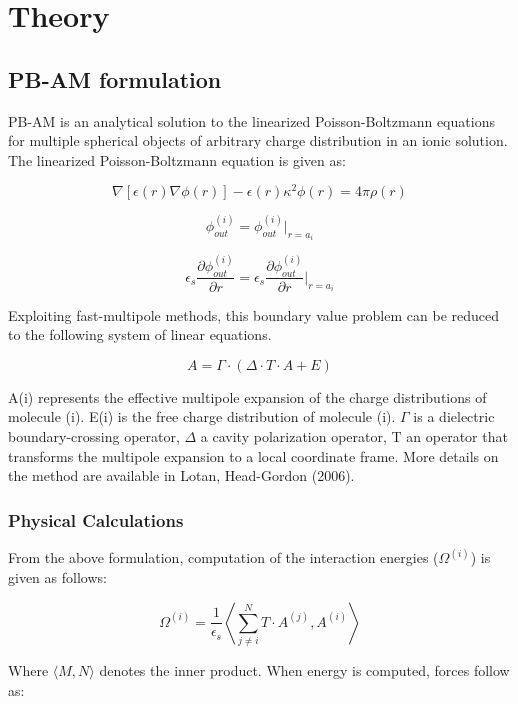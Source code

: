 
\chapter{Theory}



\section{PB-AM formulation}

PB-AM is an analytical solution to the linearized Poisson-Boltzmann equations for multiple spherical objects of arbitrary charge distribution in an ionic solution.  The linearized Poisson-Boltzmann equation is given as:

\[ \nabla [\epsilon(r) \nabla\phi(r)] - \epsilon(r) \kappa^2\phi(r) = 4 \pi \rho(r) \] %

\[ \phi_{out}^{(i)}= \phi_{out}^{(i)} \biggr |_{r=a_i } \]

\[\epsilon_s \frac{\partial \phi_{out}^{(i)}}{\partial r} =   \epsilon_s \frac{\partial \phi_{out}^{(i)}}{\partial r} \biggr |_{r=a_i } \]

Exploiting fast-multipole methods, this boundary value problem can be reduced to the following system of linear equations.  

\[ A = \Gamma \cdot (\Delta \cdot T \cdot A + E) \]

A(i) represents the effective multipole expansion of the charge distributions of molecule (i). E(i) is the free charge distribution of molecule (i). $\Gamma$ is a dielectric boundary-crossing operator, $\Delta$ a cavity polarization operator, T an operator that transforms the multipole expansion to a local coordinate frame.  More details on the method are available in Lotan, Head-Gordon (2006). \\

\subsection{Physical Calculations}

From the above formulation, computation of the interaction energies ($\Omega^{(i)}$) is given as follows:

\[\Omega^{(i)}=\frac{1}{\epsilon_s} \left \langle \sum_{j \ne i}^N  T \cdot A^{(j) } ,  A^{(i) } \right \rangle \]

Where $\langle  M, N \rangle$ denotes the inner product. When energy is computed, forces follow as:

